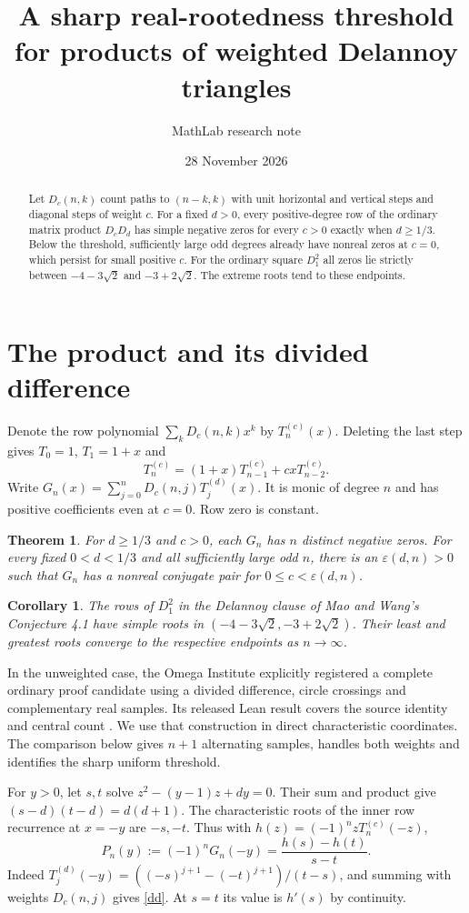 \documentclass[11pt]{article}
\title{A sharp real-rootedness threshold for products of weighted Delannoy triangles}
\author{MathLab research note}
\date{28 November 2026}
\newtheorem{theorem}{Theorem}
\newtheorem*{corollary}{Corollary}
\begin{document}
\maketitle
\begin{abstract}
Let $D_c(n,k)$ count paths to $(n-k,k)$ with unit horizontal and vertical steps and diagonal steps of weight $c$. For a fixed $d>0$, every positive-degree row of the ordinary matrix product $D_cD_d$ has simple negative zeros for every $c>0$ exactly when $d\ge 1/3$. Below the threshold, sufficiently large odd degrees already have nonreal zeros at $c=0$, which persist for small positive $c$. For the ordinary square $D_1^2$ all zeros lie strictly between $-4-3\sqrt2$ and $-3+2\sqrt2$. The extreme roots tend to these endpoints.
\end{abstract}

\section{The product and its divided difference}
Denote the row polynomial $\sum_k D_c(n,k)x^k$ by $T_n^{(c)}(x)$. Deleting the last step gives $T_0=1$, $T_1=1+x$ and
\[
 T_n^{(c)}=(1+x)T_{n-1}^{(c)}+cxT_{n-2}^{(c)}.
\]
Write $G_n(x)=\sum_{j=0}^nD_c(n,j)T_j^{(d)}(x)$. It is monic of degree $n$ and has positive coefficients even at $c=0$. Row zero is constant.
\begin{theorem}\label{main}
For $d\ge 1/3$ and $c>0$, each $G_n$ has $n$ distinct negative zeros. For every fixed $0<d<1/3$ and all sufficiently large odd $n$, there is an $\varepsilon(d,n)>0$ such that $G_n$ has a nonreal conjugate pair for $0\le c<\varepsilon(d,n)$.
\end{theorem}
\begin{corollary}
The rows of $D_1^2$ in the Delannoy clause of Mao and Wang's Conjecture 4.1 \cite{mw} have simple roots in $(-4-3\sqrt2,-3+2\sqrt2)$. Their least and greatest roots converge to the respective endpoints as $n\to\infty$.
\end{corollary}
In the unweighted case, the Omega Institute explicitly registered a complete ordinary proof candidate using a divided difference, circle crossings and complementary real samples. Its released Lean result covers the source identity and central count \cite{omega,omegaPR}. We use that construction in direct characteristic coordinates. The comparison below gives $n+1$ alternating samples, handles both weights and identifies the sharp uniform threshold.

For $y>0$, let $s,t$ solve $z^2-(y-1)z+dy=0$. Their sum and product give $(s-d)(t-d)=d(d+1)$. The characteristic roots of the inner row recurrence at $x=-y$ are $-s,-t$. Thus with $h(z)=(-1)^nzT_n^{(c)}(-z)$,
\begin{equation}\label{dd}
 P_n(y):=(-1)^nG_n(-y)=\frac{h(s)-h(t)}{s-t}.
\end{equation}
Indeed $T_j^{(d)}(-y)=((-s)^{j+1}-(-t)^{j+1})/(t-s)$, and summing with weights $D_c(n,j)$ gives \eqref{dd}. At $s=t$ its value is $h'(s)$ by continuity.
\end{document}
